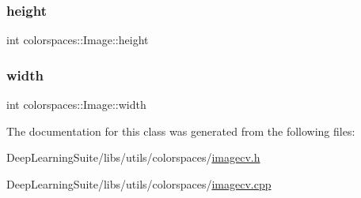 \subsubsection{\texorpdfstring{height}{height}}
{\footnotesize\ttfamily int colorspaces\+::\+Image\+::height}

\mbox{\label{classcolorspaces_1_1_image_ab80af7d4797110c23ed575b329ec7c4f}} 
\subsubsection{\texorpdfstring{width}{width}}
{\footnotesize\ttfamily int colorspaces\+::\+Image\+::width}



The documentation for this class was generated from the following files\+:\begin{DoxyCompactItemize}
\item 
Deep\+Learning\+Suite/libs/utils/colorspaces/\hyperlink{imagecv_8h}{imagecv.\+h}\item 
Deep\+Learning\+Suite/libs/utils/colorspaces/\hyperlink{imagecv_8cpp}{imagecv.\+cpp}\end{DoxyCompactItemize}
